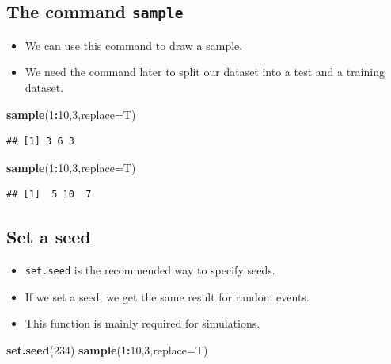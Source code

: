\documentclass[10pt,]{article}
\newenvironment{Shaded}{\begin{snugshade}}{\end{snugshade}}
\newcommand{\KeywordTok}[1]{\textcolor[rgb]{0.13,0.29,0.53}{\textbf{#1}}}
\newcommand{\DataTypeTok}[1]{\textcolor[rgb]{0.13,0.29,0.53}{#1}}
\newcommand{\DecValTok}[1]{\textcolor[rgb]{0.00,0.00,0.81}{#1}}
\newcommand{\OperatorTok}[1]{\textcolor[rgb]{0.81,0.36,0.00}{\textbf{#1}}}
\newcommand{\NormalTok}[1]{#1}
\providecommand{\tightlist}{%
  \setlength{\itemsep}{0pt}\setlength{\parskip}{0pt}}
\begin{document}
\subsection{\texorpdfstring{The command
\texttt{sample}}{The command sample}}\label{the-command-sample}

\begin{itemize}
\tightlist
\item
  We can use this command to draw a sample.
\item
  We need the command later to split our dataset into a test and a
  training dataset.
\end{itemize}

\begin{Shaded}
\begin{Highlighting}[]
\KeywordTok{sample}\NormalTok{(}\DecValTok{1}\OperatorTok{:}\DecValTok{10}\NormalTok{,}\DecValTok{3}\NormalTok{,}\DataTypeTok{replace=}\NormalTok{T)}
\end{Highlighting}
\end{Shaded}

\begin{verbatim}
## [1] 3 6 3
\end{verbatim}

\begin{Shaded}
\begin{Highlighting}[]
\KeywordTok{sample}\NormalTok{(}\DecValTok{1}\OperatorTok{:}\DecValTok{10}\NormalTok{,}\DecValTok{3}\NormalTok{,}\DataTypeTok{replace=}\NormalTok{T)}
\end{Highlighting}
\end{Shaded}

\begin{verbatim}
## [1]  5 10  7
\end{verbatim}

\subsection{Set a seed}\label{set-a-seed}

\begin{itemize}
\tightlist
\item
  \texttt{set.seed} is the recommended way to specify seeds.
\item
  If we set a seed, we get the same result for random events.
\item
  This function is mainly required for simulations.
\end{itemize}

\begin{Shaded}
\begin{Highlighting}[]
\KeywordTok{set.seed}\NormalTok{(}\DecValTok{234}\NormalTok{)}
\KeywordTok{sample}\NormalTok{(}\DecValTok{1}\OperatorTok{:}\DecValTok{10}\NormalTok{,}\DecValTok{3}\NormalTok{,}\DataTypeTok{replace=}\NormalTok{T)}
\end{Highlighting}
\end{Shaded}
\end{document}
